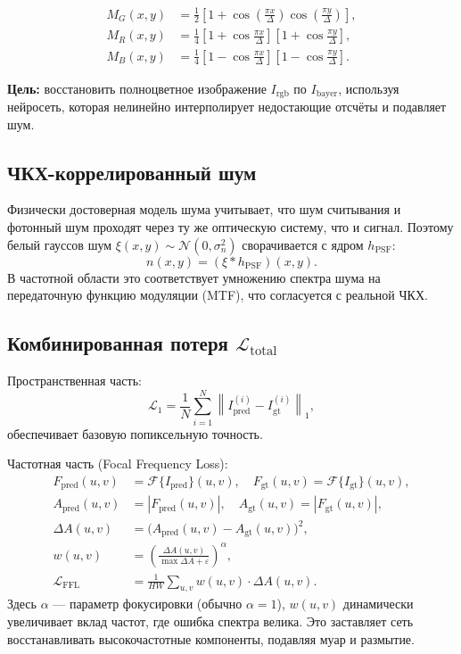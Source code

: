 \documentclass[12pt,a4paper]{article}
\begin{document}
\begin{align*}
M_G(x,y) &= \frac12\left[1+\cos\left(\frac{\pi x}{\Delta}\right)\cos\left(\frac{\pi y}{\Delta}\right)\right], \\[1ex]
M_R(x,y) &= \frac14\left[1+\cos\frac{\pi x}{\Delta}\right]\left[1+\cos\frac{\pi y}{\Delta}\right], \\[1ex]
M_B(x,y) &= \frac14\left[1-\cos\frac{\pi x}{\Delta}\right]\left[1-\cos\frac{\pi y}{\Delta}\right].
\end{align*}

\textbf{Цель:} восстановить полноцветное изображение $I_{\text{rgb}}$ по $I_{\text{bayer}}$, используя нейросеть, которая нелинейно интерполирует недостающие отсчёты и подавляет шум.

\subsection{ЧКХ-коррелированный шум}
Физически достоверная модель шума учитывает, что шум считывания и фотонный шум проходят через ту же оптическую систему, что и сигнал. Поэтому белый гауссов шум $\xi(x,y)\sim\mathcal{N}(0,\sigma_n^2)$ сворачивается с ядром $h_{\text{PSF}}$:
\[
n(x,y) = (\xi * h_{\text{PSF}})(x,y).
\]
В частотной области это соответствует умножению спектра шума на передаточную функцию модуляции (MTF), что согласуется с реальной ЧКХ.

\subsection{Комбинированная потеря $\mathcal{L}_{\text{total}}$}
Пространственная часть:
\[
\mathcal{L}_1 = \frac{1}{N}\sum_{i=1}^N \left\| I_{\text{pred}}^{(i)} - I_{\text{gt}}^{(i)} \right\|_1,
\]
обеспечивает базовую попиксельную точность.

Частотная часть (Focal Frequency Loss):
\begin{align}
    F_{\text{pred}}(u,v) &= \mathcal{F}\{I_{\text{pred}}\}(u,v), \quad 
    F_{\text{gt}}(u,v) = \mathcal{F}\{I_{\text{gt}}\}(u,v), \\
    A_{\text{pred}}(u,v) &= |F_{\text{pred}}(u,v)|, \quad A_{\text{gt}}(u,v) = |F_{\text{gt}}(u,v)|, \\
    \Delta A(u,v) &= \bigl(A_{\text{pred}}(u,v)-A_{\text{gt}}(u,v)\bigr)^2, \\
    w(u,v) &= \left(\frac{\Delta A(u,v)}{\max\Delta A + \varepsilon}\right)^\alpha, \\
    \mathcal{L}_{\text{FFL}} &= \frac{1}{HW}\sum_{u,v} w(u,v)\cdot\Delta A(u,v).
\end{align}
Здесь $\alpha$ — параметр фокусировки (обычно $\alpha=1$), $w(u,v)$ динамически увеличивает вклад частот, где ошибка спектра велика. Это заставляет сеть восстанавливать высокочастотные компоненты, подавляя муар и размытие.
\end{document}
